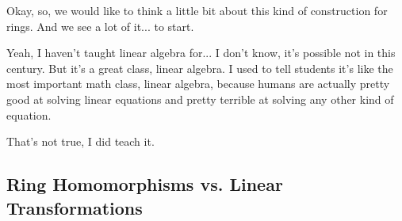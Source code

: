 \begin{speech}[00:20:12 - 00:21:10]
Okay, so, we would like to think a little bit about this kind of construction for rings. And we see a lot of it... to start.

Yeah, I haven't taught linear algebra for... I don't know, it's possible not in this century. But it's a great class, linear algebra. I used to tell students it's like the most important math class, linear algebra, because humans are actually pretty good at solving linear equations and pretty terrible at solving any other kind of equation.

That's not true, I did teach it. 
\end{speech}

\subsection{Ring Homomorphisms vs. Linear Transformations}

